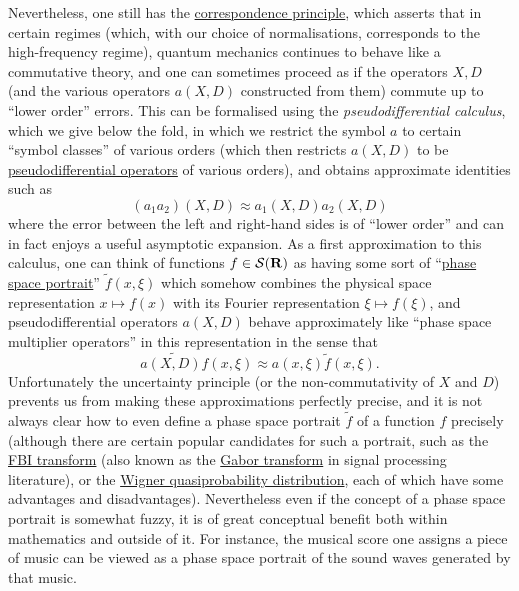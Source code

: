 \documentclass[11pt]{article}
\theoremstyle{definition}
\theoremstyle{remark}
\begin{document}
 Nevertheless, one still has the \href{https://en.wikipedia.org/wiki/Correspondence_principle}{correspondence principle}, which asserts that in certain regimes (which, with our choice of normalisations, corresponds to the high-frequency regime), quantum mechanics continues to behave like a commutative theory, and one can sometimes proceed as if the operators \({X,D}\) (and the various operators \({a(X,D)}\) constructed from them) commute up to “lower order” errors. This can be formalised using the \emph{pseudodifferential calculus}, which we give below the fold, in which we restrict the symbol \({a}\) to certain “symbol classes” of various orders (which then restricts \({a(X,D)}\) to be \href{https://en.wikipedia.org/wiki/Pseudo-differential_operator}{pseudodifferential operators} of various orders), and obtains approximate identities such as 
\[\displaystyle  (a_1 a_2)(X,D) \approx a_1(X,D) a_2(X,D)\]
 where the error between the left and right-hand sides is of “lower order” and can in fact enjoys a useful asymptotic expansion. As a first approximation to this calculus, one can think of functions \({f \in {\mathcal S}({\bf R})}\) as having some sort of “\href{https://en.wikipedia.org/wiki/Phase_portrait}{phase space portrait}” \({\tilde f(x,\xi)}\) which somehow combines the physical space representation \({x \mapsto f(x)}\) with its Fourier representation \({\xi \mapsto f(\xi)}\), and pseudodifferential operators \({a(X,D)}\) behave approximately like “phase space multiplier operators” in this representation in the sense that 
\[\displaystyle  \widetilde{a(X,D) f}(x,\xi) \approx a(x,\xi) \tilde f(x,\xi).\]
 Unfortunately the uncertainty principle (or the non-commutativity of \({X}\) and \({D}\)) prevents us from making these approximations perfectly precise, and it is not always clear how to even define a phase space portrait \({\tilde f}\) of a function \({f}\) precisely (although there are certain popular candidates for such a portrait, such as the \href{https://en.wikipedia.org/wiki/Fourier%E2%80%93Bros%E2%80%93Iagolnitzer_transform}{FBI transform} (also known as the \href{https://en.wikipedia.org/wiki/Gabor_transform}{Gabor transform} in signal processing literature), or the \href{https://en.wikipedia.org/wiki/Wigner_quasiprobability_distribution}{Wigner quasiprobability distribution}, each of which have some advantages and disadvantages). Nevertheless even if the concept of a phase space portrait is somewhat fuzzy, it is of great conceptual benefit both within mathematics and outside of it. For instance, the musical score one assigns a piece of music can be viewed as a phase space portrait of the sound waves generated by that music.
\end{document}
